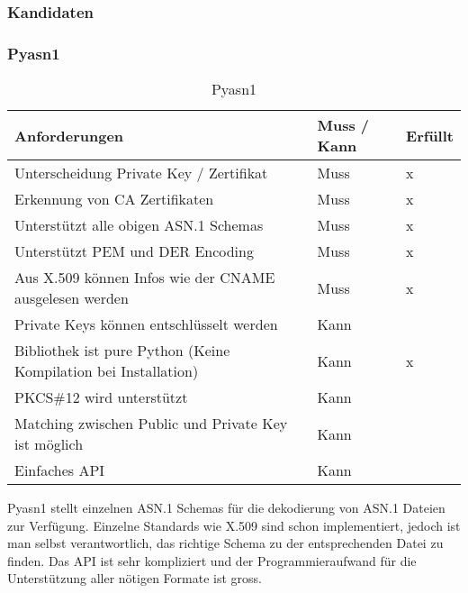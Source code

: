 \subsubsection{Kandidaten}
\subsubsection{Pyasn1 \cite{pyasn1}}
\begin{table}[H]
\centering
    \begin{tabular}{|p{12cm}|l|l|}
    \hline
    \rowcolor{lightblue}
    Anforderungen & Muss / Kann & Erfüllt   \\ \hline
	Unterscheidung Private Key / Zertifikat	&	Muss & x \\ \hline	
	Erkennung von CA Zertifikaten	&	Muss	& x \\ \hline	
	Unterstützt alle obigen ASN.1 Schemas	&	Muss	& x \\ \hline		
	Unterstützt PEM und DER Encoding	&	Muss	& x \\ \hline	
	Aus X.509 können Infos wie der CNAME ausgelesen werden &	Muss	& x \\ \hline	
	Private Keys können entschlüsselt werden &	Kann &  \\ \hline
	Bibliothek ist pure Python (Keine Kompilation bei Installation) &	Kann	&  x \\ \hline
	PKCS\#12 wird unterstützt &	Kann &  \\ \hline
	Matching zwischen Public und Private Key ist möglich &	Kann &  \\ \hline
	Einfaches API &	Kann &  \\ \hline
	\end{tabular}
    \caption[Pyasn1]{Pyasn1}
\end{table}
\medskip
Pyasn1 stellt einzelnen ASN.1 Schemas für die dekodierung von ASN.1 Dateien zur Verfügung. Einzelne Standards wie X.509 sind schon implementiert, jedoch ist man selbst verantwortlich, das richtige Schema zu der entsprechenden Datei zu finden. Das API ist sehr kompliziert und der Programmieraufwand für die Unterstützung aller nötigen Formate ist gross.\\


